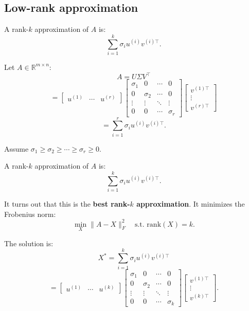 \subsection{Low-rank approximation}
\begin{definition}
    A rank-$k$ approximation of $A$ is:
    \[
    \sum_{i=1}^k \sigma_i u^{(i)} v^{(i)\top}.
    \]
\end{definition}
\begin{derivation}
    Let $A \in \mathbb{R}^{m \times n}$:
    \[
    A = U \Sigma V^\top
    \]
    \[
    = \begin{bmatrix} u^{(1)} & \cdots & u^{(r)} \end{bmatrix}
    \begin{bmatrix} 
    \sigma_1 & 0 & \cdots & 0 \\
    0 & \sigma_2 & \cdots & 0 \\
    \vdots & \vdots & \ddots & \vdots \\
    0 & 0 & \cdots & \sigma_r
    \end{bmatrix}
    \begin{bmatrix}
    v^{(1)\top} \\
    \vdots \\
    v^{(r)\top}
    \end{bmatrix}
    \]
    \[
    = \sum_{i=1}^r \sigma_i u^{(i)} v^{(i)\top}.
    \]

    Assume $\sigma_1 \geq \sigma_2 \geq \cdots \geq \sigma_r \geq 0$.

    A rank-$k$ approximation of $A$ is:
    \[
    \sum_{i=1}^k \sigma_i u^{(i)} v^{(i)\top}.
    \]

    It turns out that this is the \textbf{best rank-$k$ approximation}. It minimizes the Frobenius norm:
    \[
    \min_X \|A - X\|_F^2 \quad \text{s.t. } \text{rank}(X) = k.
    \]

    The solution is:
    \[
    X^* = \sum_{i=1}^k \sigma_i u^{(i)} v^{(i)\top}
    \]
    \[
    = \begin{bmatrix} u^{(1)} & \cdots & u^{(k)} \end{bmatrix}
    \begin{bmatrix} 
    \sigma_1 & 0 & \cdots & 0 \\
    0 & \sigma_2 & \cdots & 0 \\
    \vdots & \vdots & \ddots & \vdots \\
    0 & 0 & \cdots & \sigma_k
    \end{bmatrix}
    \begin{bmatrix}
    v^{(1)\top} \\
    \vdots \\
    v^{(k)\top}
    \end{bmatrix}.
    \]
\end{derivation}